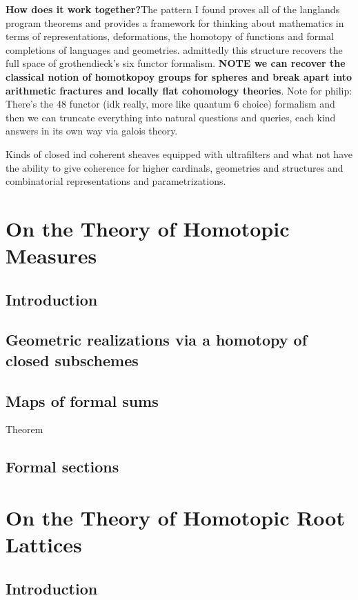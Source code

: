 \documentclass{article}
\begin{document}
\newline \newline
\textbf{How does it work together?}The pattern I found proves all of the langlands program theorems and provides a framework for thinking about mathematics in terms of representations, deformations, the homotopy of functions and formal completions of languages and geometries. admittedly this structure recovers the full space of grothendieck's six functor formalism. \textbf{NOTE we can recover the classical notion of homotkopoy groups for spheres and break apart into arithmetic fractures and locally flat cohomology theories}. Note for philip: There's the 48 functor (idk really, more like quantum 6 choice) formalism and then we can truncate everything into natural questions and queries, each kind answers in its own way via galois theory.


Kinds of closed ind coherent sheaves equipped with ultrafilters and what not have the ability to give coherence for higher cardinals, geometries and structures and combinatorial representations and parametrizations.
\tableofcontents

\section{On the Theory of Homotopic Measures}
\subsection{Introduction}
\subsection{Geometric realizations via a homotopy of closed subschemes}
\subsection{Maps of formal sums}
Theorem
\subsection{Formal sections}

\section{On the Theory of Homotopic Root Lattices}
\subsection{Introduction}
\end{document}
